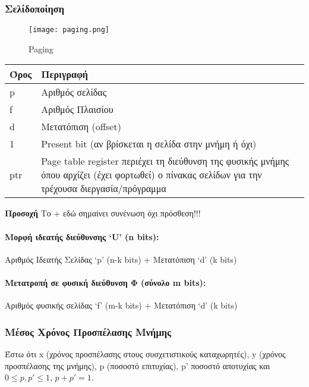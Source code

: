 \subsubsection{Σελίδοποίηση}

\begin{figure}[H]
	\centering
	\texttt{[image: paging.png]}
	\caption{Paging}
\end{figure}

\begin{center}
\begin{tabularx}{0.5\textwidth}{|X|X|}
	\hline
	Όρος & Περιγραφή \\
	\hline
	p & Αριθμός σελίδας \\
	\hline
	f & Αριθμός Πλαισίου \\
	\hline
	d & Μετατόπιση (offset)\\
	\hline
	1 & Present bit (αν βρίσκεται η σελίδα στην μνήμη ή όχι) \\
	\hline
	ptr & {Page table register περιέχει τη διεύθυνση της φυσικής
	μνήμης όπου αρχίζει (έχει φορτωθεί) ο πίνακας σελίδων
	για την τρέχουσα διεργασία/πρόγραμμα } \\
	\hline
\end{tabularx}
\end{center}

\textbf{Προσοχή} Το + εδώ σημαίνει συνένωση όχι πρόσθεση!!! \\

\paragraph{Μορφή ιδεατής διεύθυνσης `U' (n bits):} Αριθμός Ιδεατής Σελίδας `p' (n-k bits) +
Μετατόπιση `d' (k bits) \\

\paragraph{Μετατροπή σε φυσική διεύθυνση Φ (σύνολο m bits):} Αριθμός φυσικής σελίδας `f' (m-k bits)  +
Μετατόπιση `d' (k bits)

\subsubsection{Μέσος Χρόνος Προσπέλασης Μνήμης}

Έστω ότι x (χρόνος προσπέλασης στους συσχετιστικούς καταχωρητές), y (χρόνος προσπέλασης της μνήμης),
p (ποσοστό επιτυχίας), p' ποσοστό αποτυχίας και $ 0 \le p, p' \le 1$, $ p + p' = 1$.

